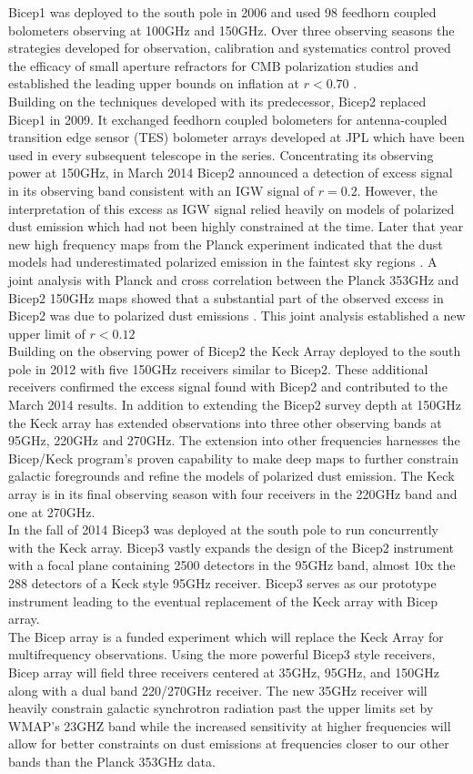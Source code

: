 \documentclass[12pt]{article}
\begin{document}
Bicep1 was deployed to the south pole in 2006 and used 98 feedhorn coupled
bolometers observing at 100GHz and 150GHz. Over three observing seasons the
strategies developed for observation, calibration and systematics control
proved the efficacy of small aperture refractors for CMB polarization studies
and established the leading upper bounds on inflation at $r<0.70$
\cite{cite:Bicep1}.
\\
Building on the techniques developed with its predecessor, Bicep2 replaced
Bicep1 in 2009. It exchanged feedhorn coupled bolometers for antenna-coupled
transition edge sensor (TES) bolometer arrays developed at JPL which have been
used in every subsequent telescope in the series. Concentrating its observing
power at 150GHz, in March 2014 Bicep2 announced a detection of excess signal
in its observing band consistent with an IGW signal of $r=0.2$\cite{cite:BK1}.
However, the interpretation of this excess as IGW signal relied heavily on
models of polarized dust emission which had not been highly constrained at the
time. Later that year new high frequency maps from the Planck experiment
indicated that the dust models had underestimated polarized emission in the
faintest sky regions \cite{cite:PlanckXIX}. A joint analysis with Planck and
cross correlation between the Planck 353GHz and Bicep2 150GHz maps showed that
a substantial part of the observed excess in Bicep2 was due to polarized dust
emissions \cite{cite:BKP}. This joint analysis established a new upper limit
of $r<0.12$
\\
Building on the observing power of Bicep2 the Keck Array deployed to the south
pole in 2012 with five 150GHz receivers similar to Bicep2. These additional
receivers confirmed the excess signal found with Bicep2 and contributed to the
March 2014 results. In addition to extending the Bicep2 survey depth at 150GHz
the Keck array has extended observations into three other observing bands at
95GHz, 220GHz and 270GHz. The extension into other frequencies harnesses
the Bicep/Keck program's proven capability to make deep maps to further
constrain galactic foregrounds and refine the models of polarized dust
emission. The Keck array is in its final observing season with four receivers
in the 220GHz band and one at 270GHz.
\\
In the fall of 2014 Bicep3 was deployed at the south pole to run concurrently
with the Keck array. Bicep3 vastly expands the design of the Bicep2 instrument with a
focal plane containing 2500 detectors in the 95GHz band, almost 10x the 288
detectors of a Keck style 95GHz receiver. Bicep3 serves as our prototype
instrument leading to the eventual replacement of the Keck array with Bicep
array.
\\
The Bicep array is a funded experiment which will replace the Keck Array for
multifrequency observations. Using the more powerful Bicep3 style receivers,
Bicep array will field three receivers centered at 35GHz, 95GHz, and 150GHz
along with a dual band 220/270GHz receiver. The new 35GHz receiver will
heavily constrain galactic synchrotron radiation past the upper limits set by
WMAP's 23GHZ band while the increased sensitivity at higher frequencies will
allow for better constraints on dust emissions at frequencies closer to our
other bands than the Planck 353GHz data.
\end{document}
